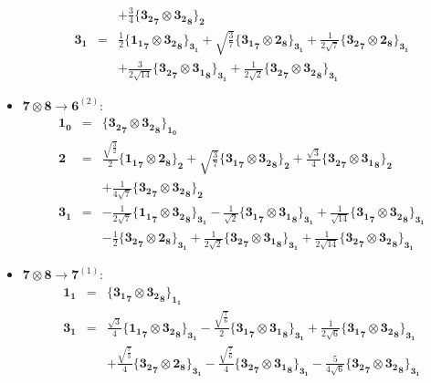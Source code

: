 \documentclass[english]{article}
\newcommand{\subcg}[3]{\big\{ {#1}\otimes{#2}\big\}^{}_{#3}}
\newcommand{\rep}[1]{\mathbf{#1}}
\begin{document}
\begin{itemize}
\begin{eqnarray*}
 & & +\frac{3}{4}\subcg{\rep{3_2}_{\rep{7}}}{\rep{3_2}_{\rep{8}}}{\rep{2}}
\\
\rep{3_1} &=& \frac{1}{2}\subcg{\rep{1_1}_{\rep{7}}}{\rep{3_2}_{\rep{8}}}{\rep{3_1}}+\sqrt{\frac{3}{7}}\subcg{\rep{3_1}_{\rep{7}}}{\rep{2}_{\rep{8}}}{\rep{3_1}}+\frac{1}{2 \sqrt{7}}\subcg{\rep{3_2}_{\rep{7}}}{\rep{2}_{\rep{8}}}{\rep{3_1}} \\ 
 & & +\frac{3}{2 \sqrt{14}}\subcg{\rep{3_2}_{\rep{7}}}{\rep{3_1}_{\rep{8}}}{\rep{3_1}}+\frac{1}{2 \sqrt{2}}\subcg{\rep{3_2}_{\rep{7}}}{\rep{3_2}_{\rep{8}}}{\rep{3_1}}
\end{eqnarray*}
\item $\rep{7}\otimes\rep{8}\to\rep{6}^{(2)}$:
\begin{eqnarray*}
\rep{1_0} &=& \subcg{\rep{3_2}_{\rep{7}}}{\rep{3_2}_{\rep{8}}}{\rep{1_0}}
\\
\rep{2} &=& \frac{\sqrt{\frac{3}{2}}}{2}\subcg{\rep{1_1}_{\rep{7}}}{\rep{2}_{\rep{8}}}{\rep{2}}+\sqrt{\frac{3}{7}}\subcg{\rep{3_1}_{\rep{7}}}{\rep{3_2}_{\rep{8}}}{\rep{2}}+\frac{\sqrt{3}}{4}\subcg{\rep{3_2}_{\rep{7}}}{\rep{3_1}_{\rep{8}}}{\rep{2}} \\ 
 & & +\frac{1}{4 \sqrt{7}}\subcg{\rep{3_2}_{\rep{7}}}{\rep{3_2}_{\rep{8}}}{\rep{2}}
\\
\rep{3_1} &=& -\frac{1}{2 \sqrt{7}}\subcg{\rep{1_1}_{\rep{7}}}{\rep{3_2}_{\rep{8}}}{\rep{3_1}}-\frac{1}{\sqrt{2}}\subcg{\rep{3_1}_{\rep{7}}}{\rep{3_1}_{\rep{8}}}{\rep{3_1}}+\frac{1}{\sqrt{14}}\subcg{\rep{3_1}_{\rep{7}}}{\rep{3_2}_{\rep{8}}}{\rep{3_1}} \\ 
 & & -\frac{1}{2}\subcg{\rep{3_2}_{\rep{7}}}{\rep{2}_{\rep{8}}}{\rep{3_1}}+\frac{1}{2 \sqrt{2}}\subcg{\rep{3_2}_{\rep{7}}}{\rep{3_1}_{\rep{8}}}{\rep{3_1}}+\frac{1}{2 \sqrt{14}}\subcg{\rep{3_2}_{\rep{7}}}{\rep{3_2}_{\rep{8}}}{\rep{3_1}}
\end{eqnarray*}
\item $\rep{7}\otimes\rep{8}\to\rep{7}^{(1)}$:
\begin{eqnarray*}
\rep{1_1} &=& \subcg{\rep{3_1}_{\rep{7}}}{\rep{3_2}_{\rep{8}}}{\rep{1_1}}
\\
\rep{3_1} &=& \frac{\sqrt{3}}{4}\subcg{\rep{1_1}_{\rep{7}}}{\rep{3_2}_{\rep{8}}}{\rep{3_1}}-\frac{\sqrt{\frac{7}{6}}}{2}\subcg{\rep{3_1}_{\rep{7}}}{\rep{3_1}_{\rep{8}}}{\rep{3_1}}+\frac{1}{2 \sqrt{6}}\subcg{\rep{3_1}_{\rep{7}}}{\rep{3_2}_{\rep{8}}}{\rep{3_1}} \\ 
 & & +\frac{\sqrt{\frac{7}{3}}}{4}\subcg{\rep{3_2}_{\rep{7}}}{\rep{2}_{\rep{8}}}{\rep{3_1}}-\frac{\sqrt{\frac{7}{6}}}{4}\subcg{\rep{3_2}_{\rep{7}}}{\rep{3_1}_{\rep{8}}}{\rep{3_1}}-\frac{5}{4 \sqrt{6}}\subcg{\rep{3_2}_{\rep{7}}}{\rep{3_2}_{\rep{8}}}{\rep{3_1}}

\end{eqnarray*}
\end{itemize}
\end{document}
